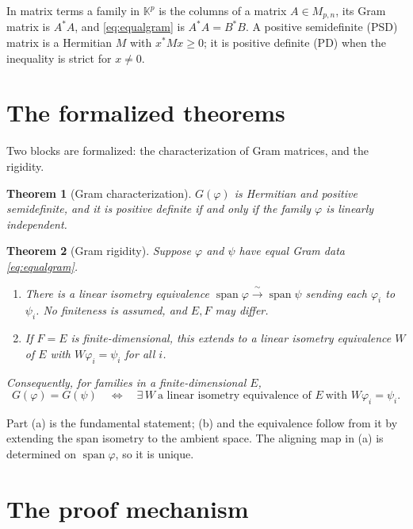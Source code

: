 \documentclass[11pt]{article}
\newcommand{\M}{M}
\newcommand{\adj}{^{*}}
\newcommand{\KK}{\mathbb K}
\newcommand{\gram}{G}
\DeclareMathOperator{\spann}{span}
\newtheorem{theorem}{Theorem}
\theoremstyle{remark}
\begin{document}
In matrix terms a family in $\KK^{p}$ is the columns of a matrix $A\in\M_{p,n}$,
its Gram matrix is $A\adj A$, and \eqref{eq:equalgram} is $A\adj A=B\adj B$.  A
positive semidefinite (PSD) matrix is a Hermitian $M$ with $x\adj Mx\ge 0$; it is
positive definite (PD) when the inequality is strict for $x\ne 0$.

\section{The formalized theorems}

Two blocks are formalized: the characterization of Gram matrices, and the
rigidity.

\begin{theorem}[Gram characterization]\label{thm:char}
$\gram(\varphi)$ is Hermitian and positive semidefinite, and it is positive
definite if and only if the family $\varphi$ is linearly independent.
\end{theorem}

\begin{theorem}[Gram rigidity]\label{thm:rigid}
Suppose $\varphi$ and $\psi$ have equal Gram data \eqref{eq:equalgram}.
\begin{enumerate}
\item[(a)] There is a linear isometry equivalence
  $\spann\varphi\xrightarrow{\ \sim\ }\spann\psi$ sending each $\varphi_i$ to
  $\psi_i$.  No finiteness is assumed, and $E,F$ may differ.
\item[(b)] If $F=E$ is finite-dimensional, this extends to a linear isometry
  equivalence $W$ of $E$ with $W\varphi_i=\psi_i$ for all $i$.
\end{enumerate}
Consequently, for families in a finite-dimensional $E$,
\[
  \gram(\varphi)=\gram(\psi)
  \quad\Longleftrightarrow\quad
  \exists\,W\ \text{a linear isometry equivalence of }E\ \text{with }
  W\varphi_i=\psi_i .
\]
\end{theorem}

Part (a) is the fundamental statement; (b) and the equivalence follow from it by
extending the span isometry to the ambient space.  The aligning map in (a) is
determined on $\spann\varphi$, so it is unique.

\section{The proof mechanism}
\end{document}
